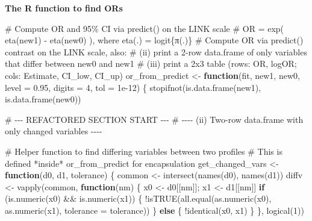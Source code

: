 \documentclass[
  letterpaper,
  DIV=11,
  numbers=noendperiod]{scrreprt}
\newenvironment{Shaded}{\begin{snugshade}}{\end{snugshade}}
\newcommand{\AttributeTok}[1]{\textcolor[rgb]{0.40,0.45,0.13}{#1}}
\newcommand{\CommentTok}[1]{\textcolor[rgb]{0.37,0.37,0.37}{#1}}
\newcommand{\ControlFlowTok}[1]{\textcolor[rgb]{0.00,0.23,0.31}{\textbf{#1}}}
\newcommand{\DecValTok}[1]{\textcolor[rgb]{0.68,0.00,0.00}{#1}}
\newcommand{\FloatTok}[1]{\textcolor[rgb]{0.68,0.00,0.00}{#1}}
\newcommand{\FunctionTok}[1]{\textcolor[rgb]{0.28,0.35,0.67}{#1}}
\newcommand{\NormalTok}[1]{\textcolor[rgb]{0.00,0.23,0.31}{#1}}
\newcommand{\OtherTok}[1]{\textcolor[rgb]{0.00,0.23,0.31}{#1}}
\newcommand{\SpecialCharTok}[1]{\textcolor[rgb]{0.37,0.37,0.37}{#1}}
\begin{document}
\textbf{The R function to find ORs}

\begin{Shaded}
\begin{Highlighting}[]
\CommentTok{\# Compute OR and 95\% CI via predict() on the LINK scale}
\CommentTok{\# OR = exp( eta(new1) {-} eta(new0) ), where eta(.) = logit\{π(.)\}}
\CommentTok{\# Compute OR via predict() contrast on the LINK scale, also:}
\CommentTok{\# (ii) print a 2{-}row data.frame of only variables that differ between new0 and new1}
\CommentTok{\# (iii) print a 2x3 table (rows: OR, logOR; cols: Estimate, CI\_low, CI\_up)}
\NormalTok{or\_from\_predict }\OtherTok{\textless{}{-}} \ControlFlowTok{function}\NormalTok{(fit, new1, new0, }\AttributeTok{level =} \FloatTok{0.95}\NormalTok{, }\AttributeTok{digits =} \DecValTok{4}\NormalTok{, }\AttributeTok{tol =} \FloatTok{1e{-}12}\NormalTok{) \{}
  \FunctionTok{stopifnot}\NormalTok{(}\FunctionTok{is.data.frame}\NormalTok{(new1), }\FunctionTok{is.data.frame}\NormalTok{(new0))}

  \CommentTok{\# {-}{-}{-} REFACTORED SECTION START {-}{-}{-}}
  \CommentTok{\# {-}{-}{-}{-} (ii) Two{-}row data.frame with only changed variables {-}{-}{-}{-}}
  
  \CommentTok{\# Helper function to find differing variables between two profiles}
  \CommentTok{\# This is defined *inside* or\_from\_predict for encapsulation}
\NormalTok{  get\_changed\_vars }\OtherTok{\textless{}{-}} \ControlFlowTok{function}\NormalTok{(d0, d1, tolerance) \{}
\NormalTok{    common }\OtherTok{\textless{}{-}} \FunctionTok{intersect}\NormalTok{(}\FunctionTok{names}\NormalTok{(d0), }\FunctionTok{names}\NormalTok{(d1))}
\NormalTok{    diffv  }\OtherTok{\textless{}{-}} \FunctionTok{vapply}\NormalTok{(common, }\ControlFlowTok{function}\NormalTok{(nm) \{}
\NormalTok{      x0 }\OtherTok{\textless{}{-}}\NormalTok{ d0[[nm]]; x1 }\OtherTok{\textless{}{-}}\NormalTok{ d1[[nm]]}
      \ControlFlowTok{if}\NormalTok{ (}\FunctionTok{is.numeric}\NormalTok{(x0) }\SpecialCharTok{\&\&} \FunctionTok{is.numeric}\NormalTok{(x1)) \{}
        \SpecialCharTok{!}\FunctionTok{isTRUE}\NormalTok{(}\FunctionTok{all.equal}\NormalTok{(}\FunctionTok{as.numeric}\NormalTok{(x0), }\FunctionTok{as.numeric}\NormalTok{(x1), }\AttributeTok{tolerance =}\NormalTok{ tolerance))}
\NormalTok{      \} }\ControlFlowTok{else}\NormalTok{ \{}
        \SpecialCharTok{!}\FunctionTok{identical}\NormalTok{(x0, x1)}
\NormalTok{      \}}
\NormalTok{    \}, }\FunctionTok{logical}\NormalTok{(}\DecValTok{1}\NormalTok{))}
    

\end{Highlighting}
\end{Shaded}
\end{document}
